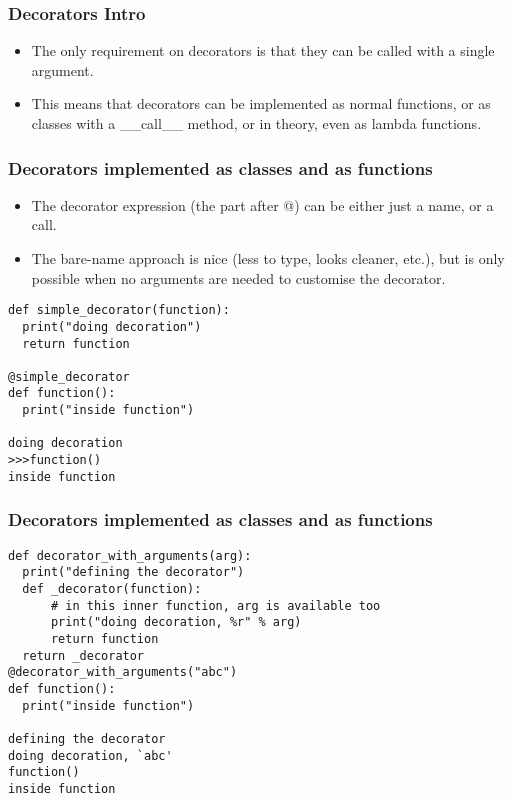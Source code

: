 \begin{frame}[fragile]\frametitle{Decorators Intro}
    \begin{itemize}
    \item The only requirement on decorators is that they can be called with a single argument. 
    \item This means that decorators can be implemented as normal functions, or as classes with a \_\_call\_\_ method, or in theory, even as lambda functions.
    \end{itemize}
\end{frame}

\begin{frame}[fragile]\frametitle{Decorators implemented as classes and as functions}
    \begin{itemize}
    \item The decorator expression (the part after @) can be either just a name, or a call. 
    \item The bare-name approach is nice (less to type, looks cleaner, etc.), but is only possible when no arguments are needed to customise the decorator. 
    \end{itemize}
            \begin{lstlisting}
def simple_decorator(function):
  print("doing decoration")
  return function
  
@simple_decorator
def function():
  print("inside function")

doing decoration
>>>function()
inside function
\end{lstlisting}
\end{frame}

\begin{frame}[fragile]\frametitle{Decorators implemented as classes and as functions}
            \begin{lstlisting}
def decorator_with_arguments(arg):
  print("defining the decorator")
  def _decorator(function):
      # in this inner function, arg is available too
      print("doing decoration, %r" % arg)
      return function
  return _decorator
@decorator_with_arguments("abc")
def function():
  print("inside function")

defining the decorator
doing decoration, `abc'
function()
inside function
\end{lstlisting}
\end{frame}

